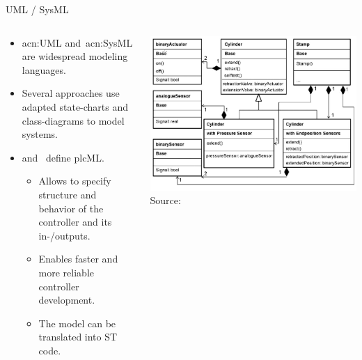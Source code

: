 \documentclass[18pt]{beamer}
\begin{document}
\begin{frame}{UML / SysML}
\begin{columns}
    \begin{column}{0.6\textwidth}
        \begin{itemize}
            \item \acrfull{acn:UML} and~\acrfull{acn:SysML} are widespread modeling languages.
            \item Several approaches use adapted state-charts and class-diagrams to model systems.
            \item \cite{WITSCH2015} and~\cite{VH:2014} define plcML.
            \begin{itemize}
                \item Allows to specify structure and behavior of the controller and its in-/outputs.
                \item Enables faster and more reliable controller development.
                \item The model can be translated into ST code.
            \end{itemize}
        \end{itemize}
    \end{column}
    \begin{column}{0.4\textwidth}
        \includegraphics[width=\textwidth]{./figures/modAT4rMS_struct.png}
       {\footnotesize  Source:~\cite{VH:2014}}
    \end{column}
\end{columns}

\end{frame}
\end{document}
